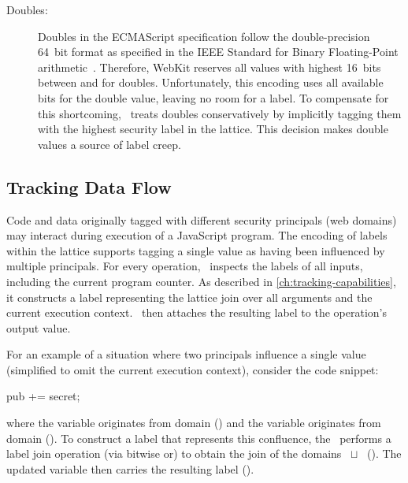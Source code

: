 \begin{description}
\item[Doubles:]
Doubles in the ECMAScript specification follow the double-precision 64~bit format as specified in the IEEE Standard for Binary Floating-Point arithmetic~\cite{ieee754}.
Therefore, WebKit reserves all values with highest 16~bits between  and  for doubles.
Unfortunately, this encoding uses all available bits for the double value, leaving no room for a label.
To compensate for this shortcoming, \JitFlow\ treats doubles conservatively by implicitly tagging them with the highest security label in the lattice.
This decision makes double values a source of label creep.

\end{description}

\subsection{Tracking Data Flow}
\label{sec:jitflow-tracking-dataflow}

Code and data originally tagged with different security principals (web domains) may interact during execution of a JavaScript program.
The encoding of labels within the lattice supports tagging a single value as having been influenced by multiple principals.
For every operation, \JitFlow\ inspects the labels of all inputs, including the current program counter.
As described in \autoref{ch:tracking-capabilities}, it constructs a label representing the lattice join over all arguments and the current execution context.
\JitFlow\ then attaches the resulting label to the operation's output value.

For an example of a situation where two principals influence a single value (simplified to omit the current execution context), consider the code snippet:

\begin{snippet}
pub += secret;
\end{snippet}

where the variable  originates from domain  () and the variable  originates from domain  ().
To construct a label that represents this confluence, the \JitFlow\ performs a label join operation (via bitwise or) to obtain the join of the domains ~$\sqcup$~ ().
The updated variable  then carries the resulting label ().


